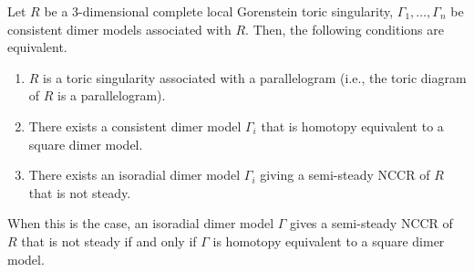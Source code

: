 \begin{theo}\label{main_thm}
Let $R$ be a $3$-dimensional complete local Gorenstein toric singularity, $\Gamma_1,\dots,\Gamma_n$ be consistent dimer models associated with $R$. Then, the following conditions are equivalent.
\begin{enumerate}%
\item\label{th4-2_1} $R$ is a toric singularity associated with a parallelogram (i.e., the toric diagram of $R$ is a parallelogram).
\item\label{th4-2_2} There exists a consistent dimer model $\Gamma_i$ that is homotopy equivalent to a square dimer model.
\item\label{th4-2_3} There exists an isoradial dimer model $\Gamma_i$ giving a semi-steady NCCR of $R$ that is not steady.
\end{enumerate}
When this is the case, an isoradial dimer model $\Gamma$ gives a semi-steady NCCR of $R$ that is not steady if and only if $\Gamma$ is homotopy equivalent to a square dimer model.
\end{theo}
